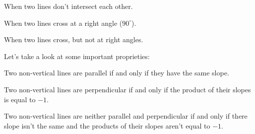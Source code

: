 \label{les_1_unit_1:identify_parallel_and_perpendicular_lines}

\begin{definition}[Parallel]
  \label{def:parallel}

  When two lines don't intersect each other.
\end{definition}

\begin{definition}[Perpendicular]
  \label{def:perpendicular}

  When two lines cross at a right angle ($90^{\circ}$).
\end{definition}

\begin{definition}[Neither]
  \label{def:neither}

  When two lines cross, but not at right angles.
\end{definition}

Let's take a look at some important proprieties:

\begin{property}
  \label{prop:parallel_slope_property}

  Two non-vertical lines are parallel if and only if they have the same slope.
\end{property}

\begin{property}
  \label{prop:perpendicular_slope_property}

  Two non-vertical lines are perpendicular if and only if the product of their
  slopes is equal to $-1$.
\end{property}

\begin{property}
  \label{prop:perpendicular_slope_property}

  Two non-vertical lines are neither parallel and perpendicular if and only if
  there slope isn't the same and the products of their slopes aren't equal to
  $-1$.
\end{property}

